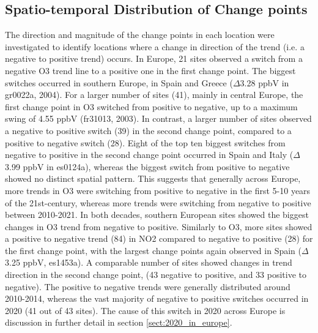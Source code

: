 \documentclass[journal abbreviation, manuscript]{copernicus}
\begin{document}
\clearpage

\subsection{Spatio-temporal Distribution of Change points} \label{sect:case_studies}


The direction and magnitude of the change points in each location were investigated to identify locations where a change in direction of the trend (i.e. a negative to positive trend) occurs. In Europe, 21 sites observed a switch from a negative O3 trend line to a positive one in the first change point. The biggest switches occurred in southern Europe, in Spain and Greece ($\Delta$3.28 ppbV in gr0022a, 2004). For a larger number of sites (41), mainly in central Europe, the first change point in O3 switched from positive to negative, up to a maximum swing of 4.55 ppbV (fr31013, 2003). In contrast, a larger number of sites observed a negative to positive switch (39) in the second change point, compared to a positive to negative switch (28). Eight of the top ten biggest switches from negative to positive in the second change point occurred in Spain and Italy ($\Delta$3.99 ppbV in es0124a), whereas the biggest switch from positive to negative showed no distinct spatial pattern. This suggests that generally across Europe, more trends in O3 were switching from positive to negative in the first 5-10 years of the 21st-century, whereas more trends were switching from negative to positive between 2010-2021. In both decades, southern European sites showed the biggest changes in O3 trend from negative to positive.
Similarly to O3, more sites showed a positive to negative trend (84) in NO2 compared to negative to positive (28) for the first change point, with the largest change points again observed in Spain ($\Delta$3.25 ppbV, es1453a). A comparable number of sites showed changes in trend direction in the second change point, (43 negative to positive, and 33 positive to negative). The positive to negative trends were generally distributed around 2010-2014, whereas the vast majority of negative to positive switches occurred in 2020 (41 out of 43 sites). The cause of this switch in 2020 across Europe is discussion in further detail in section \ref{sect:2020_in_europe}.
\end{document}
